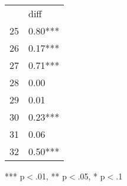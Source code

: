 \documentclass{article}
\begin{document}
\begin{table}[!h]
\centering
\begin{tabular}{ll}
\cline{1-2}
\multicolumn{1}{|l}{} &
  \multicolumn{1}{|l|}{diff} \\
\cline{1-2}
\multicolumn{1}{|l}{25} &
  \multicolumn{1}{|l|}{0.80***} \\
\cline{1-2}
\multicolumn{1}{|l}{26} &
  \multicolumn{1}{|l|}{0.17***} \\
\cline{1-2}
\multicolumn{1}{|l}{27} &
  \multicolumn{1}{|l|}{0.71***} \\
\cline{1-2}
\multicolumn{1}{|l}{28} &
  \multicolumn{1}{|l|}{0.00} \\
\cline{1-2}
\multicolumn{1}{|l}{29} &
  \multicolumn{1}{|l|}{0.01} \\
\cline{1-2}
\multicolumn{1}{|l}{30} &
  \multicolumn{1}{|l|}{0.23***} \\
\cline{1-2}
\multicolumn{1}{|l}{31} &
  \multicolumn{1}{|l|}{0.06} \\
\cline{1-2}
\multicolumn{1}{|l}{32} &
  \multicolumn{1}{|l|}{0.50***} \\
\cline{1-2}
\end{tabular}

\footnotesize{
*** p$<$.01, ** p$<$.05, * p$<$.1
}
\end{table}
\end{document}
